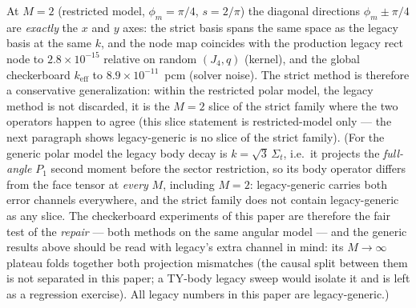 \documentclass[11pt,a4paper]{article}
\begin{document}
At $M=2$ (restricted model, $\phi_m=\pi/4$, $s=2/\pi$) the diagonal
directions $\phi_m \pm \pi/4$ are \emph{exactly} the $x$ and $y$ axes:
the strict basis spans the same space as the legacy basis at the same
$k$, and the node map coincides with the production legacy rect node to
$2.8\times10^{-15}$ relative on random $(J_4,q)$ (kernel), and the
global checkerboard $k_{\mathrm{eff}}$ to $8.9\times10^{-11}$~pcm
(solver noise).  The strict method is therefore a conservative
generalization: within the restricted polar model, the legacy method
is not discarded, it is the $M{=}2$
slice of the strict family where the two operators happen to agree
(this slice statement is restricted-model only --- the next paragraph
shows legacy-generic is no slice of the strict family).
(For the generic polar model the legacy body decay is
$k=\sqrt{3}\,\Sigma_t$, i.e.\ it projects the \emph{full-angle} $P_1$
second moment before the sector restriction, so its body operator
differs from the face tensor at \emph{every} $M$, including $M=2$:
legacy-generic carries both error channels everywhere, and the strict
family does not contain legacy-generic as any slice. The checkerboard
experiments of this paper are therefore the fair test of the
\emph{repair} --- both methods on the same angular model --- and the
generic results above should be read with legacy's extra channel in
mind: its $M{\to}\infty$ plateau folds together both projection
mismatches (the causal split between them is not separated in this
paper; a TY-body legacy sweep would isolate it and is left as a
regression exercise). All legacy numbers in this paper are
legacy-generic.)
\end{document}
